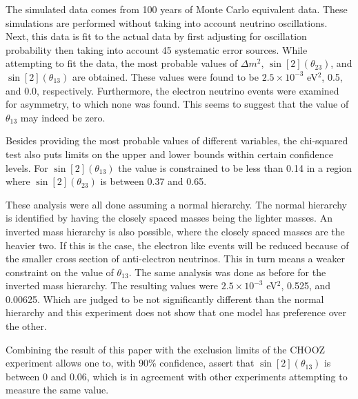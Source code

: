 \documentclass[letter,12pt]{article}
\begin{document}
The simulated data comes from 100 years of Monte Carlo equivalent data.
These simulations are performed without taking into account neutrino
oscillations. Next, this data is fit to the actual data by first
adjusting for oscillation probability then taking into account 45
systematic error sources. While attempting to fit the data, the 
most probable values of $\Delta m^2$, $\sin[2](\theta_{23})$, and
$\sin[2](\theta_{13})$ 
are obtained. These values were found to be $2.5 \times 10^{-3}$ eV$^2$,
0.5, and 0.0, respectively. Furthermore, the electron neutrino
events were examined for asymmetry, to which none was found. This 
seems to suggest that the value of $\theta_{13}$ may indeed be zero.

Besides providing the most probable values of different variables,
the chi-squared test also puts limits on the upper and lower bounds
within certain confidence levels. For $\sin[2](\theta_{13})$ the value
is constrained to be less than 0.14 in a region where $\sin[2](\theta_{23})$
is between 0.37 and 0.65.

These analysis were all done assuming a normal hierarchy. The normal 
hierarchy is identified by having the closely spaced masses being the
lighter masses. An inverted mass hierarchy is also possible, where the
closely spaced masses are the heavier two. If this is the case, the 
electron like events will be reduced because of the smaller cross 
section of anti-electron neutrinos. This in turn means a weaker
constraint on the value of $\theta_{13}$. The same analysis was done as 
before for the inverted mass hierarchy. The resulting values 
were $2.5 \times 10^{-3}$ eV$^2$, 0.525, and 0.00625. Which are
judged to be not significantly different than the normal
hierarchy and this experiment does not show that one model
has preference over the other. 

Combining the result of this paper with the exclusion limits
of the CHOOZ experiment allows one to, with 90\% confidence, 
assert that $\sin[2](\theta_{13})$ is between 0 and 0.06, which
is in agreement with other experiments attempting to measure
the same value. 



\end{document}
